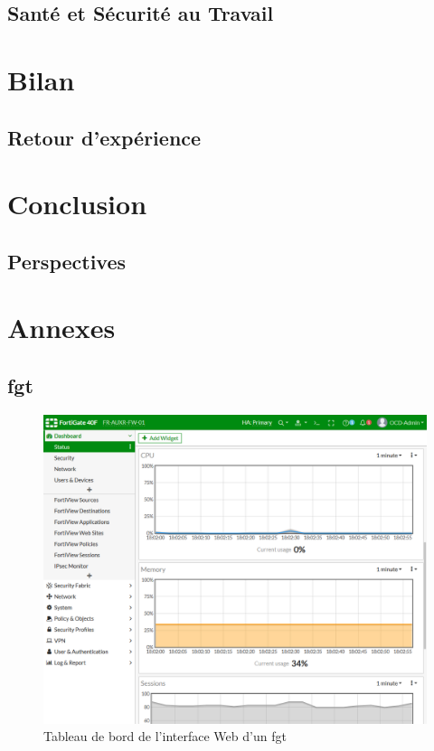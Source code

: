 \documentclass[12pt, oneside, a4paper, titlepage]{report}
\begin{document}
\section{Santé et Sécurité au Travail}%
\label{sec:rse::sst}


\chapter{Bilan}%
\label{cha:bilan}

\section{Retour d'expérience}%
\label{sec:bilan::ret-exp}


\chapter{Conclusion}%
\label{cha:conclu}

\section{Perspectives}%
\label{sec:conclu::persp}


\chapter{Annexes}%
\label{cha:annexes}

\section{\acrlong{fgt}}%
\label{sec:annexes::fgt}

\begin{figure}[h!]
    \centering
    \includegraphics[width = \linewidth]{img/fgt-auxr/dashboard.png}
    \caption{Tableau de bord de l'interface Web d'un \acrlong{fgt}}%
    \label{fig:fgt-auxr/dashboard.png}
\end{figure}
\end{document}
